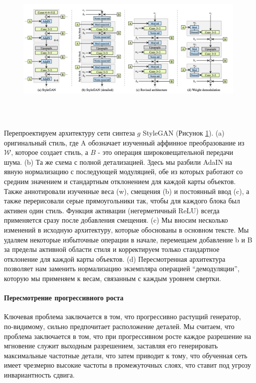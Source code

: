 \begin{figure}
    \centering
    \includegraphics[height=75mm]{fig/stylegan2_scheme.png}
    \caption{}
    \label{fig.stylegan2_scheme}
\end{figure}
Перепроектируем архитектуру сети синтеза $g$ StyleGAN (Рисунок {\color{blue} \ref{fig.stylegan2_scheme}}). (a) оригинальный стиль, где A обозначает изученный
аффинное преобразование из $\mathcal{W}$, которое создает стиль, а $B$ - это операция широковещательной передачи шума. (b) Та же схема с полной детализацией. Здесь мы разбили AdaIN на явную нормализацию с последующей модуляцией, обе из которых работают со средним значением и стандартным отклонением для каждой карты объектов. Также аннотировали изученные веса (w), смещения (b) и постоянный ввод (c), а также перерисовали серые прямоугольники так, чтобы для каждого блока был активен один стиль. Функция активации (негерметичный ReLU) всегда применяется сразу после добавления смещения. (c) Мы вносим несколько изменений в исходную архитектуру, которые обоснованы в основном тексте. Мы удаляем некоторые избыточные операции в начале, перемещаем добавление b и B за пределы активной области стиля и корректируем только стандартное отклонение для каждой карты объектов. (d) Пересмотренная архитектура позволяет нам заменить нормализацию экземпляра операцией “демодуляции”, которую мы применяем к весам, связанным с каждым уровнем свертки\cite{StyleGAN2}.

\paragraph{Пересмотрение прогрессивного роста}

Ключевая проблема заключается в том, что прогрессивно растущий генератор, по-видимому, сильно предпочитает расположение деталей. Мы считаем, что проблема заключается в том, что при прогрессивном росте каждое разрешение на мгновение служит выходным разрешением, заставляя его генерировать максимальные частотные детали, что затем приводит к тому, что обученная сеть имеет чрезмерно высокие частоты в промежуточных слоях, что ставит под угрозу инвариантность сдвига\cite{shift_invariant_networks}.

